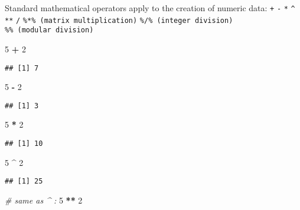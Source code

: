 \documentclass[]{article}
\newenvironment{Shaded}{\begin{snugshade}}{\end{snugshade}}
\newcommand{\DecValTok}[1]{\textcolor[rgb]{0.00,0.00,0.81}{#1}}
\newcommand{\StringTok}[1]{\textcolor[rgb]{0.31,0.60,0.02}{#1}}
\newcommand{\CommentTok}[1]{\textcolor[rgb]{0.56,0.35,0.01}{\textit{#1}}}
\newcommand{\OperatorTok}[1]{\textcolor[rgb]{0.81,0.36,0.00}{\textbf{#1}}}
\begin{document}
Standard mathematical operators apply to the creation of numeric data:
\texttt{+} \texttt{-} \texttt{*} \texttt{\^{}} \texttt{**} \texttt{/}
\texttt{\%*\%\ (matrix\ multiplication)}
\texttt{\%/\%\ (integer\ division)} \texttt{\%\%\ (modular\ division)}

\begin{Shaded}
\begin{Highlighting}[]
\DecValTok{5} \OperatorTok{+}\StringTok{ }\DecValTok{2}  
\end{Highlighting}
\end{Shaded}

\begin{verbatim}
## [1] 7
\end{verbatim}

\begin{Shaded}
\begin{Highlighting}[]
\DecValTok{5} \OperatorTok{-}\StringTok{ }\DecValTok{2}  
\end{Highlighting}
\end{Shaded}

\begin{verbatim}
## [1] 3
\end{verbatim}

\begin{Shaded}
\begin{Highlighting}[]
\DecValTok{5} \OperatorTok{*}\StringTok{ }\DecValTok{2}  
\end{Highlighting}
\end{Shaded}

\begin{verbatim}
## [1] 10
\end{verbatim}

\begin{Shaded}
\begin{Highlighting}[]
\DecValTok{5} \OperatorTok{^}\StringTok{ }\DecValTok{2}  
\end{Highlighting}
\end{Shaded}

\begin{verbatim}
## [1] 25
\end{verbatim}

\begin{Shaded}
\begin{Highlighting}[]
\CommentTok{# same as ^ :}
\DecValTok{5} \OperatorTok{**}\StringTok{ }\DecValTok{2}  
\end{Highlighting}
\end{Shaded}
\end{document}
